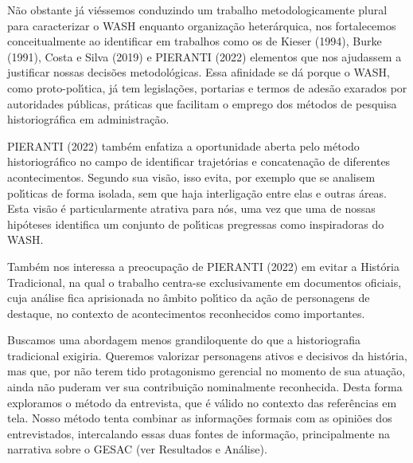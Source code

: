 \documentclass[
12pt,		%
openright,	%
twoside,  %
a4paper,			%
chapter=TITLE,		%
english,			%
french,				%
spanish,			%
brazil				%
]{USPSC-classe/USPSC}
\begin{document}
N\~ao obstante j\'a vi\'essemos conduzindo um trabalho metodologicamente plural para caracterizar o WASH enquanto organiza\c{c}\~ao heter\'arquica, nos fortalecemos conceitualmente ao identificar em trabalhos como os de  Kieser (1994),  Burke (1991), Costa e Silva (2019) e PIERANTI (2022) elementos que nos ajudassem a justificar nossas decis\~oes metodol\'ogicas. Essa afinidade se d\'a porque o WASH, como proto-pol\'{\i}tica, j\'a tem legisla\c{c}\~oes, portarias e termos de ades\~ao exarados por autoridades p\'ublicas, pr\'aticas que facilitam o emprego dos m\'etodos de pesquisa historiogr\'afica em administra\c{c}\~ao.










 PIERANTI (2022) tamb\'em enfatiza a oportunidade aberta pelo m\'etodo historiogr\'afico  no campo de identificar trajet\'orias e concatena\c{c}\~ao de diferentes acontecimentos. Segundo sua vis\~ao, \textquotedbl isso evita, por exemplo que se analisem pol\'{\i}ticas de forma isolada, sem que haja interliga\c{c}\~ao entre elas e outras \'areas\textquotedbl . Esta vis\~ao \'e particularmente atrativa para n\'os, uma vez que uma de nossas hip\'oteses identifica um conjunto de pol\'{\i}ticas pregressas como inspiradoras do WASH.










Tamb\'em nos interessa a preocupa\c{c}\~ao de  PIERANTI (2022) em evitar a Hist\'oria Tradicional, na qual o trabalho centra-se exclusivamente em documentos oficiais, cuja an\'alise fica aprisionada no \^ambito pol\'{\i}tico da a\c{c}\~ao de \textquotedbl personagens de destaque\textquotedbl , no contexto de \textquotedbl acontecimentos reconhecidos como importantes\textquotedbl .










Buscamos uma abordagem menos grandiloquente do que a historiografia tradicional exigiria. Queremos valorizar personagens ativos e decisivos da hist\'oria, mas que, por n\~ao terem tido protagonismo gerencial no momento de sua atua\c{c}\~ao, ainda n\~ao puderam ver sua contribui\c{c}\~ao nominalmente reconhecida. Desta forma exploramos o m\'etodo da entrevista, que \'e v\'alido no contexto das refer\^encias em tela. Nosso m\'etodo tenta combinar as informa\c{c}\~oes formais com as opini\~oes dos entrevistados, intercalando essas duas fontes de informa\c{c}\~ao, principalmente na narrativa sobre o GESAC (ver Resultados e An\'alise).
\end{document}
